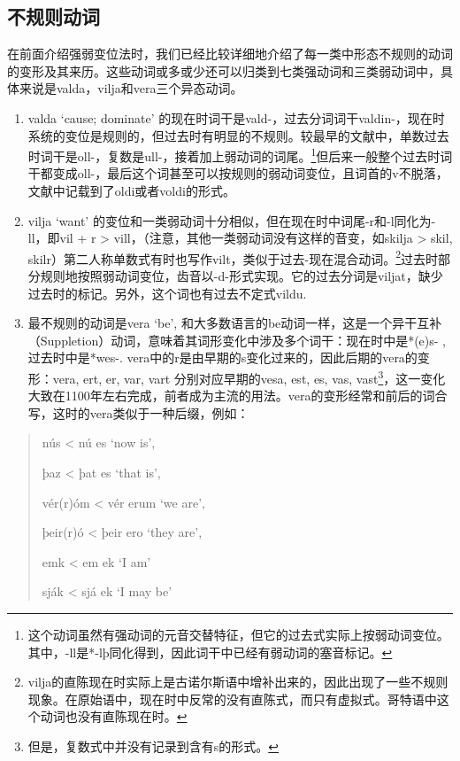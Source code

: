 \subsection{不规则动词}\label{不规则动词}

在前面介绍强弱变位法时，我们已经比较详细地介绍了每一类中形态不规则的动词的变形及其来历。这些动词或多或少还可以归类到七类强动词和三类弱动词中，具体来说是valda，vilja和vera三个异态动词。

\begin{enumerate}
  \def\labelenumi{\arabic{enumi}.}
  \item
        valda `cause; dominate‌'
        的现在时词干是vald-，过去分词词干valdin-，现在时系统的变位是规则的，但过去时有明显的不规则。较最早的文献中，单数过去时词干是oll-，复数是ull-，接着加上弱动词的词尾。\footnote{这个动词虽然有强动词的元音交替特征，但它的过去式实际上按弱动词变位。其中，-ll是*-lþ同化得到，因此词干中已经有弱动词的塞音标记。}但后来一般整个过去时词干都变成oll-，最后这个词甚至可以按规则的弱动词变位，且词首的v不脱落，文献中记载到了oldi或者voldi的形式。
  \item
        vilja `want‌'
        的变位和一类弱动词十分相似，但在现在时中词尾-r和-l同化为-ll，即vil + r
        \textgreater{} vill，（注意，其他一类弱动词没有这样的音变，如skilja
        \textgreater{} skil,
        skilr）第二人称单数式有时也写作vilt，类似于过去-现在混合动词。\footnote{vilja的直陈现在时实际上是古诺尔斯语中增补出来的，因此出现了一些不规则现象。在原始语中，现在时中反常的没有直陈式，而只有虚拟式。哥特语中这个动词也没有直陈现在时。}过去时部分规则地按照弱动词变位，齿音以-d-形式实现。它的过去分词是viljat，缺少过去时的标记。另外，这个词也有过去不定式vildu.
  \item
        最不规则的动词是vera `be‌',
        和大多数语言的be动词一样，这是一个异干互补（Suppletion）动词，意味着其词形变化中涉及多个词干：现在时中是*(e)s-
        , 过去时中是*wes-.
        vera中的r是由早期的s变化过来的，因此后期的vera的变形：vera, ert, er,
        var, vart 分别对应早期的vesa, est, es, vas,
        vast\footnote{但是，复数式中并没有记录到含有s的形式。}，这一变化大致在1100年左右完成，前者成为主流的用法。vera的变形经常和前后的词合写，这时的vera类似于一种后缀，例如：
\end{enumerate}

\begin{quote}
  nús \textless{} nú es `now is‌',

  þaz \textless{} þat es `that is‌',

  vér(r)óm \textless{} vér erum `we are‌',

  þeir(r)ó \textless{} þeir ero `they are‌',

  emk \textless{} em ek `I am'

  sják \textless{} sjá ek `I may be'
\end{quote}

